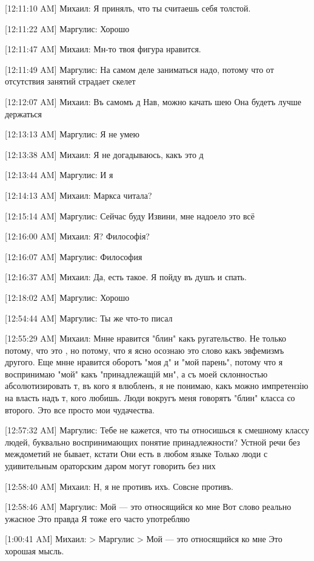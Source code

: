 \documentclass{article}
\newcommand{\yat}{{\fontencoding{X2}\selectfont\cyryat}} %
\begin{document}
[12:11:10 AM] Михаил:
Я принялъ, что ты считаешь себя толстой.

[12:11:22 AM] Маргулис:
Хорошо

[12:11:47 AM] Михаил:
Мн\yat-то твоя фигура нравится.

[12:11:49 AM] Маргулис:
На самом деле заниматься надо, потому что от отсутствия занятий страдает скелет

[12:12:07 AM] Михаил:
Въ самомъ д\yatл\yat
 Нав, можно качать шею
 Она будетъ лучше держаться

[12:13:13 AM] Маргулис:
Я не умею

[12:13:38 AM] Михаил:
Я не догадываюсь, какъ это д

[12:13:44 AM] Маргулис:
И я

[12:14:13 AM] Михаил:
Маркса читала?

[12:15:14 AM] Маргулис:
Сейчас буду
 Извини, мне надоело это всё

[12:16:00 AM] Михаил:
Я? Философія?

[12:16:07 AM] Маргулис:
Философия

[12:16:37 AM] Михаил:
Да, есть такое.
 Я пойду въ душъ и спать.

[12:18:02 AM] Маргулис:
Хорошо

[12:54:44 AM] Маргулис:
Ты же что-то писал

[12:55:29 AM] Михаил:
Мн\yat не нравится "блин" какъ ругательство. Не только потому, что это , но потому, что я ясно осознаю это слово какъ эвфемизмъ другого.
Еще мн\yat не нравится оборотъ "моя д" и "мой парень", потому что я воспринимаю "мой" какъ "принадлежащій мн\yat", а съ моей склонностью абсолютизировать т, въ кого я влюбленъ, я не понимаю, какъ можно им претензію на власть надъ т, кого любишь.
 Люди вокругъ меня говорятъ "блин" класса со второго.
 Это все просто мои чудачества.

[12:57:32 AM] Маргулис:
Тебе не кажется, что ты относишься к смешному классу людей, буквально воспринимающих понятие принадлежности?
 Устной речи без междометий не бывает, кстати
 Они есть в любом языке
 Только люди с удивительным ораторским даром могут говорить без них

[12:58:40 AM] Михаил:
Н, я не противъ ихъ. Совс не противъ.

[12:58:46 AM] Маргулис:
Мой — это относящийся ко мне
 Вот слово реально ужасное
 Это правда
 Я тоже его часто употребляю

[1:00:41 AM] Михаил:
> Маргулис
> Мой — это относящийся ко мне
Это хорошая мысль.
\end{document}
